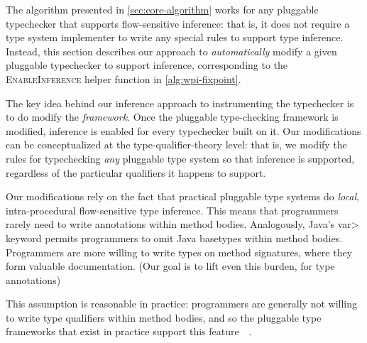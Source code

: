 The algorithm presented in \cref{sec:core-algorithm} works for
any pluggable typechecker that supports flow-sensitive inference:
that is, it does not require a type system implementer to write
any special rules to support type inference. Instead, this section
describes our approach to \emph{automatically} modify a given
pluggable typechecker to support inference, corresponding to the
\textsc{Enable\-Inference} helper function in \cref{alg:wpi-fixpoint}.

The key idea behind our inference approach to instrumenting the typechecker
is to do modify the \emph{framework}.  Once the pluggable type-checking
framework is modified, inference is enabled for every typechecker built on it.
Our modifications
can be conceptualized at the type-qualifier-theory level: that is,
we modify the rules for typechecking \emph{any} pluggable type system
so that inference is supported,
regardless of the particular qualifiers it happens to support.

Our modifications rely on the fact that practical pluggable type systems
do \emph{local}, intra-procedural flow-sensitive type inference.
This means that programmers rarely need to write annotations within method bodies.
Analogously, Java's \<var> keyword permits programmers to omit Java basetypes within
method bodies.
Programmers are more willing to write types on method
signatures, where they form valuable documentation.  (Our goal is to lift
even this burden, for type annotations)

This assumption is
reasonable in practice: programmers are generally not willing to
write type qualifiers within method bodies, and so 
the pluggable type frameworks that exist in practice 
support this feature~\cite{PapiACPE2008}~.  

